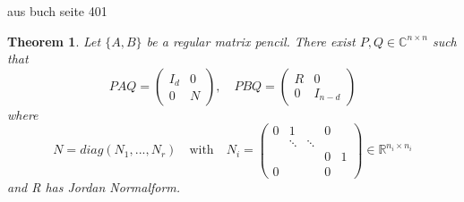 \documentclass[11pt,titlepage]{article}
\newtheorem{theorem}{Theorem}
\begin{document}
				aus buch seite 401
				\begin{theorem}
					\label{Kronecker-Normalform}
					Let $\{ A,B \}$ be a regular matrix pencil. There exist $P,Q \in \mathbb{C}^{n \times n}$ such that
					\begin{displaymath}
						PAQ = 
						\left(
						\begin{matrix}
							I_d & 0 \\
							0 & N 
						\end{matrix}
						\right), \quad
						PBQ = 
						\left(
						\begin{matrix}
							R & 0 \\
							0 & I_{n-d}
						\end{matrix}
						\right)
					\end{displaymath}
					where
					\begin{displaymath}
						N = diag(N_1, ..., N_r) \quad \text{with} \quad N_i = 
						\left(
						\begin{matrix}
							0 & 1 & & 0\\
							& \ddots &\ddots & \\
							& & & 0 & 1 \\
							0 & & & 0
						\end{matrix}
						\right)
						\in \mathbb{R}^{n_i \times n_i}
					\end{displaymath}
					and R has Jordan Normalform.
				\end{theorem}
\end{document}
